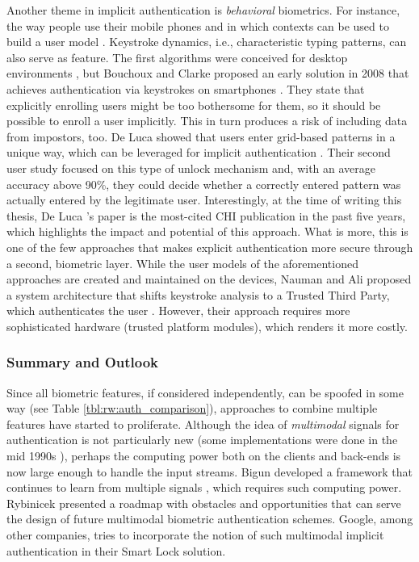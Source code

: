 	
	Another theme in implicit authentication is \textit{behavioral} biometrics. For instance, the way people use their mobile phones and in which contexts can be used to build a user model \cite{Jakobsson2009ImplicitAuthentication}. Keystroke dynamics, i.e., characteristic typing patterns, can also serve as feature. The first algorithms were conceived for desktop environments \cite{Crawford2010KeystrokeDynamics}, but Bouchoux and Clarke proposed an early solution in 2008 that achieves authentication via keystrokes on smartphones \cite{Buchoux2008KeystrokeAnalysis}. They state that explicitly enrolling users might be too bothersome for them, so it should be possible to enroll a user implicitly. This in turn produces a risk of including data from impostors, too. De Luca showed that users enter grid-based patterns in a unique way, which can be leveraged for implicit authentication \cite{DeLuca2012TouchMeOnce}. Their second user study focused on this type of unlock mechanism and, with an average accuracy above 90\%, they could decide whether a correctly entered pattern was actually entered by the legitimate user. Interestingly, at the time of writing this thesis, De Luca \etal's paper is the most-cited CHI publication in the past five  years, which highlights the impact and potential of this approach. What is more, this is  one of the few approaches that makes explicit authentication more secure through a second, biometric layer. While the user models of the aforementioned approaches are created and maintained on the devices, Nauman and Ali proposed a system architecture that shifts keystroke analysis to a Trusted Third Party, which authenticates the user \cite{Nauman2010TOKEN}. However, their approach requires more sophisticated hardware (trusted platform modules), which renders it more costly.

	\subsubsection{Summary and Outlook}
	Since all biometric features, if considered independently, can be spoofed in some way (see Table \ref{tbl:rw:auth_comparison}), approaches to combine multiple features have started to proliferate. Although the idea of \textit{multimodal} signals for authentication is not particularly new (some implementations were done in the mid 1990s \cite{Brunelli1995PersonIdentificationMultipleCues}), perhaps the computing power both on the clients and back-ends is now large enough to handle the input streams. Bigun \etal developed a framework that continues to learn from multiple signals \cite{Bigun2005CombiningBiometricEvidence}, which requires such computing power.	Rybinicek \etal presented a roadmap with obstacles and opportunities \cite{Rybnicek2014RoadmapContinuousAuth} that can serve the design of future multimodal biometric authentication schemes. Google, among other companies, tries to incorporate the notion of such multimodal implicit authentication in their Smart Lock solution. 
	

